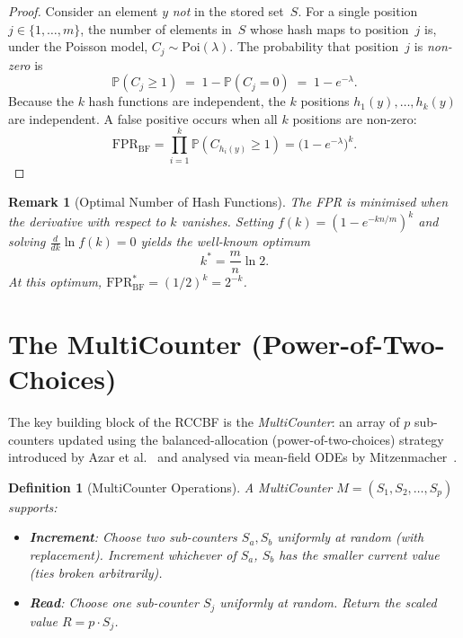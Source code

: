 \documentclass[11pt,a4paper]{article}
\newtheorem{definition}[theorem]{Definition}
\newtheorem{remark}[theorem]{Remark}
\newcommand{\RCCBF}{\textsf{RCCBF}}
\newcommand{\FPR}{\mathrm{FPR}}
\newcommand{\Poi}{\mathrm{Poi}}
\newcommand{\Prob}{\mathbb{P}}
\begin{document}
\begin{proof}
Consider an element $y$ \emph{not} in the stored set~$S$.
For a single position~$j \in \{1,\ldots,m\}$, the number of elements in~$S$
whose hash maps to position~$j$ is, under the Poisson model,
$C_j \sim \Poi(\lambda)$.  The probability that position~$j$ is \emph{non-zero}
is
\begin{equation}\label{eq:pj-nonzero}
  \Prob(C_j \ge 1) \;=\; 1 - \Prob(C_j = 0)
  \;=\; 1 - e^{-\lambda}.
\end{equation}
Because the $k$ hash functions are independent, the $k$ positions
$h_1(y), \ldots, h_k(y)$ are independent.  A false positive occurs when
all $k$ positions are non-zero:
\[
  \FPR_{\mathrm{BF}}
  = \prod_{i=1}^{k}\Prob(C_{h_i(y)} \ge 1)
  = \bigl(1 - e^{-\lambda}\bigr)^{k}.
\]
\end{proof}

\begin{remark}[Optimal Number of Hash Functions]\label{rem:optimal-k}
The FPR is minimised when the derivative with respect to $k$ vanishes.
Setting $f(k) = (1 - e^{-kn/m})^k$ and solving
$\frac{d}{dk}\ln f(k) = 0$ yields the well-known optimum
\begin{equation}\label{eq:optimal-k}
  k^{*} = \frac{m}{n}\ln 2.
\end{equation}
At this optimum, $\FPR_{\mathrm{BF}}^{*} = (1/2)^k = 2^{-k}$.
\end{remark}

\section{The MultiCounter (Power-of-Two-Choices)}\label{sec:multicounter}

The key building block of the \RCCBF{} is the \emph{MultiCounter}: an
array of $p$ sub-counters updated using the balanced-allocation
(power-of-two-choices) strategy introduced by Azar et
al.~\cite{azar1999} and analysed via mean-field ODEs by
Mitzenmacher~\cite{mitzenmacher1996,mitzenmacher2001}.

\begin{definition}[MultiCounter Operations]\label{def:multicounter}
A MultiCounter $M = (S_1, S_2, \ldots, S_p)$ supports:
\begin{itemize}
  \item \textbf{Increment}: Choose two sub-counters $S_a, S_b$ uniformly
        at random (with replacement).  Increment whichever of $S_a$, $S_b$
        has the smaller current value (ties broken arbitrarily).
  \item \textbf{Read}: Choose one sub-counter $S_j$ uniformly at random.
        Return the \emph{scaled value} $R = p \cdot S_j$.
\end{itemize}
\end{definition}
\end{document}
